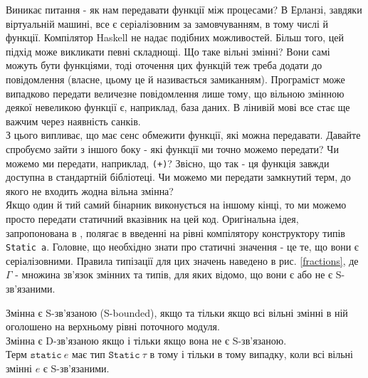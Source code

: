 \documentclass[12pt]{article}
\begin{document}
Виникає питання - як нам передавати функції між процесами? В Ерланзі, завдяки віртуальній машині, все 
є серіалізовним за замовчуванням, в тому числі й функції. Компілятор Haskell не надає подібних можливостей. 
Більш того, цей підхід може викликати певні складнощі. Що таке вільні змінні? Вони самі можуть бути 
функціями, тоді оточення цих функцій теж треба додати до повідомлення (власне, цьому це й називається 
замиканням). Програміст може випадково передати величезне повідомлення лише тому, що вільною змінною 
деякої невеликою функції є, наприклад, база даних. В лінивій мові все стає ще важчим через наявність 
санків.\\

З цього випливає, що має сенс обмежити функції, які можна передавати. Давайте спробуємо зайти з іншого 
боку - які функції ми точно можемо передати? Чи можемо ми передати, наприклад, \lstinline{(+)}? Звісно, 
що так - ця функція завжди доступна в стандартній бібліотеці. Чи можемо ми передати замкнутий терм, до якого не входить жодна вільна змінна?\\

Якщо один й тий самий бінарник виконується на іншому кінці, то ми 
можемо просто передати статичний вказівник на цей код. Оригінальна ідея, запропонована в \cite{haskellInCloud}, полягає в введенні на рівні компілятору конструктору типів \lstinline{Static a}. Головне, що необхідно знати про статичні значення - це те, що вони є серіалізовними. Правила типізації для цих значень наведено в рис. \ref{fractions},  де $\Gamma$ - множина зв'язок змінних та типів, для яких відомо, що вони є або не є S-зв'язаними.

Змінна є S-зв'язаною (S-bounded), 
якщо та тільки якщо всі вільні змінні в ній оголошено на верхньому рівні поточного модуля.\\ 

Змінна є D-зв'язаною якщо і тільки якщо вона не є S-зв'язаною.\\

Терм $\mathtt{static} \  e$ має тип $\mathtt{Static} \ \tau$ в тому і тільки в тому випадку, коли всі вільні змінні $e$ є S-зв'язаними.\\
\end{document}
